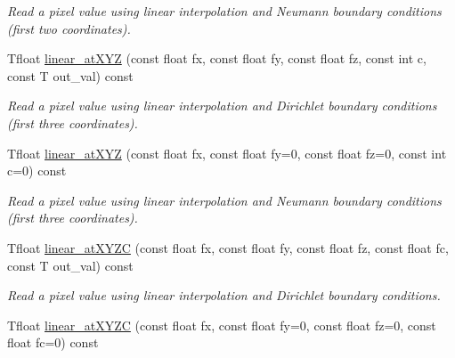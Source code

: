 \begin{DoxyCompactItemize}
\begin{DoxyCompactList}\small\item\em Read a pixel value using linear interpolation and Neumann boundary conditions (first two coordinates). \item\end{DoxyCompactList}\item 
\hypertarget{structcimg__library_1_1CImg_a43c55502d4c7c06cc8f49f7295f41656}{
Tfloat \hyperlink{structcimg__library_1_1CImg_a43c55502d4c7c06cc8f49f7295f41656}{linear\_\-atXYZ} (const float fx, const float fy, const float fz, const int c, const T out\_\-val) const }
\label{structcimg__library_1_1CImg_a43c55502d4c7c06cc8f49f7295f41656}

\begin{DoxyCompactList}\small\item\em Read a pixel value using linear interpolation and Dirichlet boundary conditions (first three coordinates). \item\end{DoxyCompactList}\item 
\hypertarget{structcimg__library_1_1CImg_af44e0eab1b6680afb5a1cbd4c0027bad}{
Tfloat \hyperlink{structcimg__library_1_1CImg_af44e0eab1b6680afb5a1cbd4c0027bad}{linear\_\-atXYZ} (const float fx, const float fy=0, const float fz=0, const int c=0) const }
\label{structcimg__library_1_1CImg_af44e0eab1b6680afb5a1cbd4c0027bad}

\begin{DoxyCompactList}\small\item\em Read a pixel value using linear interpolation and Neumann boundary conditions (first three coordinates). \item\end{DoxyCompactList}\item 
\hypertarget{structcimg__library_1_1CImg_af6a9c2a5a1653e382f113fdf08dbe79c}{
Tfloat \hyperlink{structcimg__library_1_1CImg_af6a9c2a5a1653e382f113fdf08dbe79c}{linear\_\-atXYZC} (const float fx, const float fy, const float fz, const float fc, const T out\_\-val) const }
\label{structcimg__library_1_1CImg_af6a9c2a5a1653e382f113fdf08dbe79c}

\begin{DoxyCompactList}\small\item\em Read a pixel value using linear interpolation and Dirichlet boundary conditions. \item\end{DoxyCompactList}\item 
\hypertarget{structcimg__library_1_1CImg_a068b35af02c465ff7bef18a065595072}{
Tfloat \hyperlink{structcimg__library_1_1CImg_a068b35af02c465ff7bef18a065595072}{linear\_\-atXYZC} (const float fx, const float fy=0, const float fz=0, const float fc=0) const }
\label{structcimg__library_1_1CImg_a068b35af02c465ff7bef18a065595072}


\end{DoxyCompactItemize}
